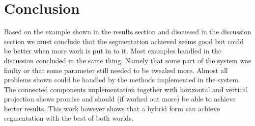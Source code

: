 \section{Conclusion} %
\label{sec:conclusion}

Based on the example shown in the results section and discussed in the discussion section we must conclude that the segmentation achieved seems good but could be better when more work is put in to it. Most examples handled in the discussion concluded in the same thing. Namely that some part of the system was faulty or that some parameter still needed to be tweaked more. Almost all problems shown could be handled by the methods implemented in the system. The connected components implementation together with horizontal and vertical projection shows promise and should (if worked out more) be  able to  achieve better results. This work however shows that a hybrid form can achieve segmentation with the best of both worlds.